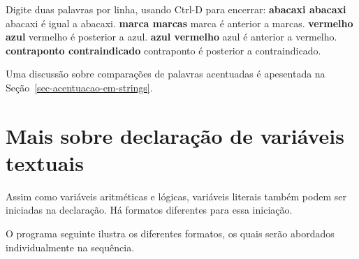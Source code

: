 \documentclass[
  11pt,
  a4paper,
]{scrbook}
\newenvironment{Shaded}{\begin{snugshade}}{\end{snugshade}}
\newcommand{\KeywordTok}[1]{\textcolor[rgb]{0.13,0.29,0.53}{\textbf{#1}}}
\newcommand{\NormalTok}[1]{#1}
\begin{document}
\begin{Shaded}
\begin{Highlighting}[]
\NormalTok{Digite duas palavras por linha, usando Ctrl{-}D para encerrar:}
\KeywordTok{ abacaxi abacaxi }
\NormalTok{abacaxi é igual a abacaxi.}
\KeywordTok{ marca marcas }
\NormalTok{marca é anterior a marcas.}
\KeywordTok{ vermelho azul }
\NormalTok{vermelho é posterior a azul.}
\KeywordTok{ azul vermelho }
\NormalTok{azul é anterior a vermelho.}
\KeywordTok{ contraponto contraindicado }
\NormalTok{contraponto é posterior a contraindicado.}
\end{Highlighting}
\end{Shaded}

Uma discussão sobre comparações de palavras acentuadas é apesentada na
Seção~\ref{sec-acentuacao-em-strings}.

\section{Mais sobre declaração de variáveis
textuais}\label{mais-sobre-declarauxe7uxe3o-de-variuxe1veis-textuais}

Assim como variáveis aritméticas e lógicas, variáveis literais também
podem ser iniciadas na declaração. Há formatos diferentes para essa
iniciação.

O programa seguinte ilustra os diferentes formatos, os quais serão
abordados individualmente na sequência.
\end{document}
